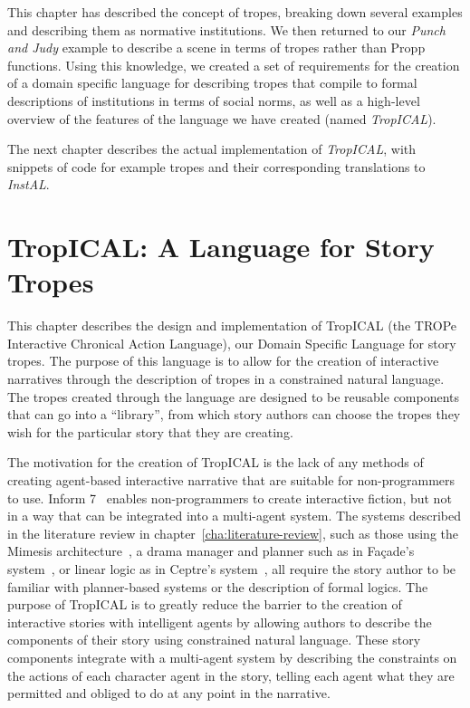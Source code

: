 \documentclass[11pt]{report}
\begin{document}
This chapter has described the concept of tropes, breaking down several examples
and describing them as normative institutions. We then returned to our
\emph{Punch and Judy} example to describe a scene in terms of tropes rather than
Propp functions. Using this knowledge, we created a set of requirements for the
creation of a domain specific language for describing tropes that compile to
formal descriptions of institutions in terms of social norms, as well as a
high-level overview of the features of the language we have created (named \emph{TropICAL}).

The next chapter describes the actual implementation of \emph{TropICAL}, with snippets of code for example tropes and their
corresponding translations to \emph{InstAL}.




\chapter{TropICAL: A Language for Story Tropes}
\label{cha:tropical}

This chapter describes the design and implementation of TropICAL (the TROPe
Interactive Chronical Action Language), our Domain Specific Language for
story tropes. The purpose of this language is to allow for the
creation of interactive narratives through the description of tropes in a
constrained natural language. The tropes created through the language are
designed to be reusable components that can go into a ``library'', from which
story authors can choose the tropes they wish for the particular story that they
are creating.

The motivation for the creation of TropICAL is the lack of any methods of
creating agent-based interactive narrative that are suitable for non-programmers
to use. Inform 7~\citep{reed2010creating} enables non-programmers to create
interactive fiction, but not in a way that can be integrated into a multi-agent
system.
The systems described in the literature review in
chapter~\ref{cha:literature-review}, such as those using the Mimesis
architecture~\citep{young2004architecture}, a drama manager and planner such as
in Fa\c{c}ade's system~\citep{mateas2003faccade}, or linear logic as in Ceptre's
system~\citep{martens2015ceptre}, all require the story author to be familiar with
planner-based systems or the description of formal logics. The purpose of
TropICAL is to greatly reduce the barrier to the creation of interactive stories
with intelligent agents by allowing authors to describe the components of their story using constrained
natural language. These story components integrate with a multi-agent system by
describing the constraints on the actions of each character agent in the story,
telling each agent what they are permitted and obliged to do at any point in the
narrative.
\end{document}
